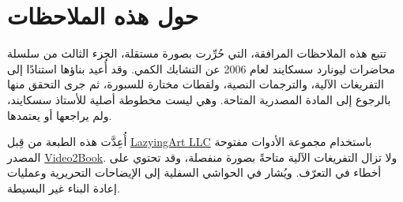 \documentclass[11pt,oneside]{book}
\begin{document}
\frontmatter
\hypersetup{pageanchor=false}

\hypersetup{pageanchor=true}

\clearpage
\chapter*{حول هذه الملاحظات}
تتبع هذه الملاحظات المرافقة، التي حُرِّرت بصورة مستقلة، الجزء الثالث من سلسلة محاضرات ليونارد سسكايند لعام 2006 عن التشابك الكمي. وقد أُعيد بناؤها استنادًا إلى التفريغات الآلية، والترجمات النصية، ولقطات مختارة للسبورة، ثم جرى التحقق منها بالرجوع إلى المادة المصدرية المتاحة. وهي ليست مخطوطة أصلية للأستاذ سسكايند، ولم يراجعها أو يعتمدها.

أُعِدَّت هذه الطبعة من قِبل \href{https://lazying.art}{LazyingArt LLC} باستخدام مجموعة الأدوات مفتوحة المصدر \href{https://github.com/lachlanchen/Video2Book}{Video2Book}. ولا تزال التفريغات الآلية متاحةً بصورة منفصلة، وقد تحتوي على أخطاء في التعرّف. ويُشار في الحواشي السفلية إلى الإيضاحات التحريرية وعمليات إعادة البناء غير البسيطة.
\clearpage
\tableofcontents
\mainmatter








\end{document}
